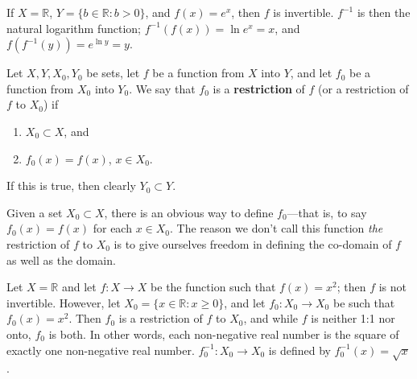 \documentclass[12pt]{article}
\begin{document}
\begin{exm}
  If $X = \mathbb{R}$, $Y = \{b \in \mathbb{R}: b > 0\}$, and $f(x) = e^x$, then $f$
  is invertible. $f^{-1}$ is then the natural logarithm function; $f^{-1}(f(x)) = \ln
  e^x = x$, and $f(f^{-1}(y)) = e^{\ln y} = y$.
\end{exm}

\begin{defn}
  Let $X,Y,X_0,Y_0$ be sets, let $f$ be a function from $X$ into $Y$, and let $f_0$
  be a function from $X_0$ into $Y_0$. We say that $f_0$ is a \textbf{restriction} of
  $f$ (or a restriction of $f$ to $X_0$) if
  \begin{enumerate}
    \item
      $X_0 \subset X$, and
    \item
      $f_0(x) = f(x)$, $x \in X_0$.
  \end{enumerate}
  If this is true, then clearly $Y_0 \subset Y$.

  Given a set $X_0 \subset X$, there is an obvious way to define $f_0$—that is, to
  say $f_0(x) = f(x)$ for each $x \in X_0$. The reason we don't call this function
  \textit{the} restriction of $f$ to $X_0$ is to give ourselves freedom in defining
  the co-domain of $f$ as well as the domain.
\end{defn}

\begin{exm}
  Let $X = \mathbb{R}$ and let $f:X \to X$ be the function such that $f(x) = x^2$;
  then $f$ is not invertible. However, let $X_0 = \{x \in \mathbb{R}: x \geq 0\}$,
  and let $f_0:X_0 \to X_0$ be such that $f_0(x) = x^2$. Then $f_0$ is a restriction
  of $f$ to $X_0$, and while $f$ is neither 1:1 nor onto, $f_0$ is both. In other
  words, each non-negative real number is the square of exactly one non-negative real
  number. $f_0^{-1}: X_0 \to X_0$ is defined by $f_0^{-1}(x) = \sqrt{x}$.
\end{exm}
\end{document}
